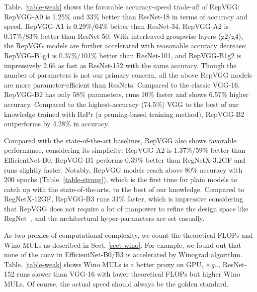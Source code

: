 \documentclass[final]{cvpr}
\makeatletter
\DeclareRobustCommand\onedot{\futurelet\@let@token\@onedot}
\def\@onedot{\ifx\@let@token.\else.\null\fi\xspace}
\def\eg{\emph{e.g}\onedot}
\makeatother
\begin{document}
Table. \ref{table-weak} shows the favorable accuracy-speed trade-off of RepVGG: RepVGG-A0 is 1.25\% and 33\% better than ResNet-18 in terms of accuracy and speed, RepVGG-A1 is 0.29\%/64\% better than ResNet-34, RepVGG-A2 is 0.17\%/83\% better than ResNet-50. With interleaved groupwise layers (g2/g4), the RepVGG models are further accelerated with reasonable accuracy decrease: RepVGG-B1g4 is 0.37\%/101\% better than ResNet-101, and RepVGG-B1g2 is impressively 2.66 as fast as ResNet-152 with the same accuracy. Though the number of parameters is not our primary concern, all the above RepVGG models are more parameter-efficient than ResNets. Compared to the classic VGG-16, RepVGG-B2 has only 58\% parameters, runs 10\% faster and shows 6.57\% higher accuracy. Compared to the highest-accuracy (74.5\%) VGG to the best of our knowledge trained with RePr \cite{repr} (a pruning-based training method), RepVGG-B2 outperforms by 4.28\% in accuracy.

Compared with the state-of-the-art baselines, RepVGG also shows favorable performance, considering its simplicity: RepVGG-A2 is 1.37\%/59\% better than EfficientNet-B0, RepVGG-B1 performs 0.39\% better than RegNetX-3.2GF and runs slightly faster. Notably, RepVGG models reach above 80\% accuracy with 200 epochs (Table. \ref{table-strong}), which is the first time for plain models to catch up with the state-of-the-arts, to the best of our knowledge. Compared to RegNetX-12GF, RepVGG-B3 runs 31\% faster, which is impressive considering that RepVGG does not require a lot of manpower to refine the design space like RegNet~\cite{regnet}, and the architectural hyper-parameters are set casually.

As two proxies of computational complexity, we count the theoretical FLOPs and Wino MULs as described in Sect. \ref{sect-wino}. For example, we found out that none of the conv in EfficientNet-B0/B3 is accelerated by Winograd algorithm. Table. \ref{table-weak} shows Wino MULs is a better proxy on GPU, \eg, ResNet-152 runs slower than VGG-16 with lower theoretical FLOPs but higher Wino MULs. Of course, the actual speed should always be the golden standard.
\end{document}
